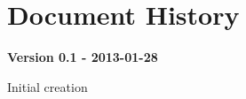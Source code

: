 \newpage
\section*{Document History}

\textbf {Version 0.1 - 2013-01-28}
\begin{compactitem}
\item Initial creation \\
\end{compactitem}

